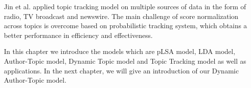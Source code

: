 Jin et al. \cite{jin1999topic} applied topic tracking model on multiple sources of data in the form of radio, TV broadcast and newswire. The main challenge of score normalization across topics is overcome based on probabilistic tracking system, which obtains a better performance in efficiency and effectiveness. 

In this chapter we introduce the models which are pLSA model, LDA model, Author-Topic model, Dynamic Topic model and Topic Tracking model as well as applications. In the next chapter, we will give an introduction of our Dynamic Author-Topic model.




 
